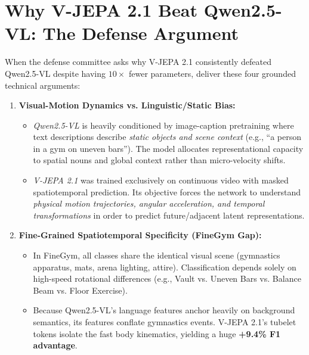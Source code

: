 \documentclass[a4paper, 11pt]{article}
\begin{document}
\vspace{0.3cm}

\section{Why V-JEPA 2.1 Beat Qwen2.5-VL: The Defense Argument}

When the defense committee asks why V-JEPA 2.1 consistently defeated Qwen2.5-VL despite having $10\times$ fewer parameters, deliver these four grounded technical arguments:

\begin{enumerate}[leftmargin=*]
    \item \textbf{Visual-Motion Dynamics vs. Linguistic/Static Bias:}
    \begin{itemize}
        \item \emph{Qwen2.5-VL} is heavily conditioned by image-caption pretraining where text descriptions describe \emph{static objects and scene context} (e.g., ``a person in a gym on uneven bars''). The model allocates representational capacity to spatial nouns and global context rather than micro-velocity shifts.
        \item \emph{V-JEPA 2.1} was trained exclusively on continuous video with masked spatiotemporal prediction. Its objective forces the network to understand \emph{physical motion trajectories, angular acceleration, and temporal transformations} in order to predict future/adjacent latent representations.
    \end{itemize}

    \item \textbf{Fine-Grained Spatiotemporal Specificity (FineGym Gap):}
    \begin{itemize}
        \item In FineGym, all classes share the identical visual scene (gymnastics apparatus, mats, arena lighting, attire). Classification depends solely on high-speed rotational differences (e.g., Vault vs. Uneven Bars vs. Balance Beam vs. Floor Exercise).
        \item Because Qwen2.5-VL's language features anchor heavily on background semantics, its features conflate gymnastics events. V-JEPA 2.1's tubelet tokens isolate the fast body kinematics, yielding a huge \textbf{+9.4\% F1 advantage}.
    \end{itemize}


\end{enumerate}
\end{document}

